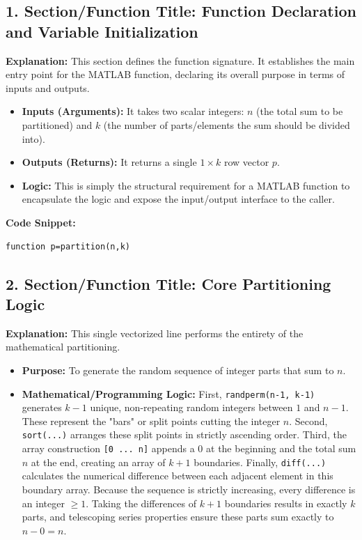 \subsection{1. Section/Function Title: Function Declaration and Variable Initialization}
\textbf{Explanation:} 
This section defines the function signature. It establishes the main entry point for the MATLAB function, declaring its overall purpose in terms of inputs and outputs. 
\begin{itemize}
    \item \textbf{Inputs (Arguments):} It takes two scalar integers: $n$ (the total sum to be partitioned) and $k$ (the number of parts/elements the sum should be divided into).
    \item \textbf{Outputs (Returns):} It returns a single $1 \times k$ row vector $p$.
    \item \textbf{Logic:} This is simply the structural requirement for a MATLAB function to encapsulate the logic and expose the input/output interface to the caller.
\end{itemize}

\textbf{Code Snippet:}
\begin{lstlisting}
function p=partition(n,k)
\end{lstlisting}

\subsection{2. Section/Function Title: Core Partitioning Logic}
\textbf{Explanation:} 
This single vectorized line performs the entirety of the mathematical partitioning.
\begin{itemize}
    \item \textbf{Purpose:} To generate the random sequence of integer parts that sum to $n$.
    \item \textbf{Mathematical/Programming Logic:} 
    First, \texttt{randperm(n-1, k-1)} generates $k-1$ unique, non-repeating random integers between $1$ and $n-1$. These represent the "bars" or split points cutting the integer $n$.
    Second, \texttt{sort(...)} arranges these split points in strictly ascending order.
    Third, the array construction \texttt{[0 ... n]} appends a $0$ at the beginning and the total sum $n$ at the end, creating an array of $k+1$ boundaries.
    Finally, \texttt{diff(...)} calculates the numerical difference between each adjacent element in this boundary array. Because the sequence is strictly increasing, every difference is an integer $\ge 1$. Taking the differences of $k+1$ boundaries results in exactly $k$ parts, and telescoping series properties ensure these parts sum exactly to $n - 0 = n$.
\end{itemize}

